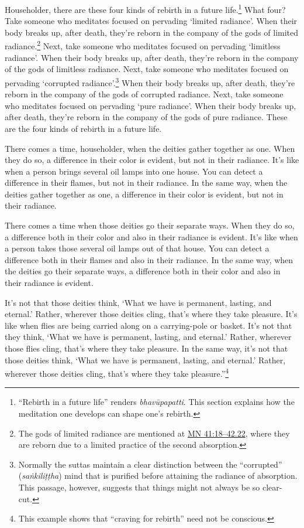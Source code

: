 \documentclass[12pt,openany]{book}%
\begin{document}
Householder, there are these four kinds of rebirth in a future life.\footnote{“Rebirth in a future life” renders \textit{\textsanskrit{bhavūpapatti}}. This section explains how the meditation one develops can shape one’s rebirth. } What four? Take someone who meditates focused on pervading ‘limited radiance’. When their body breaks up, after death, they’re reborn in the company of the gods of limited radiance.\footnote{The gods of limited radiance are mentioned at \href{https://suttacentral.net/mn41/en/sujato\#18-42.22}{MN 41:18–42.22}, where they are reborn due to a limited practice of the second absorption. } Next, take someone who meditates focused on pervading ‘limitless radiance’. When their body breaks up, after death, they’re reborn in the company of the gods of limitless radiance. Next, take someone who meditates focused on pervading ‘corrupted radiance’.\footnote{Normally the suttas maintain a clear distinction between the “corrupted” (\textit{\textsanskrit{saṅkiliṭṭha}}) mind that is purified before attaining the radiance of absorption. This passage, however, suggests that things might not always be so clear-cut. } When their body breaks up, after death, they’re reborn in the company of the gods of corrupted radiance. Next, take someone who meditates focused on pervading ‘pure radiance’. When their body breaks up, after death, they’re reborn in the company of the gods of pure radiance. These are the four kinds of rebirth in a future life. 

There comes a time, householder, when the deities gather together as one. When they do so, a difference in their color is evident, but not in their radiance. It’s like when a person brings several oil lamps into one house. You can detect a difference in their flames, but not in their radiance. In the same way, when the deities gather together as one, a difference in their color is evident, but not in their radiance. 

There comes a time when those deities go their separate ways. When they do so, a difference both in their color and also in their radiance is evident. It’s like when a person takes those several oil lamps out of that house. You can detect a difference both in their flames and also in their radiance. In the same way, when the deities go their separate ways, a difference both in their color and also in their radiance is evident. 

It’s not that those deities think, ‘What we have is permanent, lasting, and eternal.’ Rather, wherever those deities cling, that’s where they take pleasure. It’s like when flies are being carried along on a carrying-pole or basket. It’s not that they think, ‘What we have is permanent, lasting, and eternal.’ Rather, wherever those flies cling, that’s where they take pleasure. In the same way, it’s not that those deities think, ‘What we have is permanent, lasting, and eternal.’ Rather, wherever those deities cling, that’s where they take pleasure.”\footnote{This example shows that “craving for rebirth” need not be conscious. } 
\end{document}
